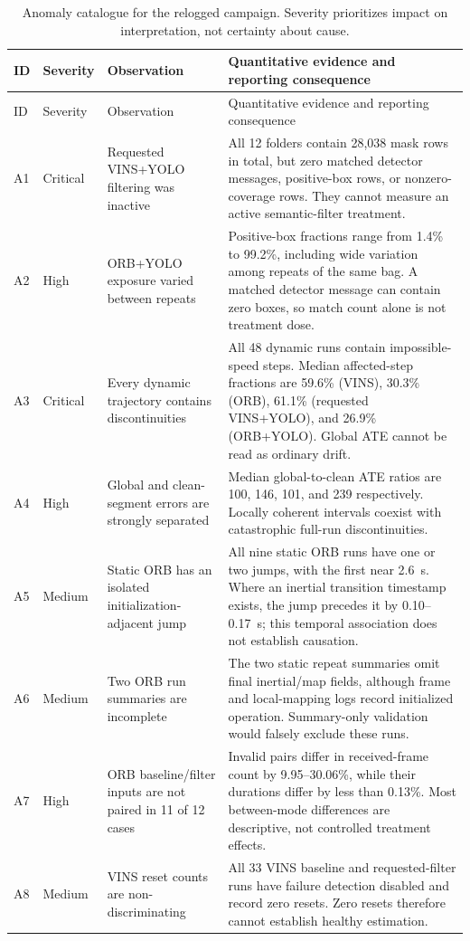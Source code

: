\begingroup
\small
\setlength{\tabcolsep}{4pt}
\setlength{\LTcapwidth}{\textwidth}
\begin{longtable}{p{}p{}p{}p{}}
\caption{Anomaly catalogue for the relogged campaign. Severity prioritizes
impact on interpretation, not certainty about cause.}
\label{tab:anomaly-catalogue}\\
\toprule
ID & Severity & Observation & Quantitative evidence and reporting consequence \\
\midrule
\endfirsthead
\toprule
ID & Severity & Observation & Quantitative evidence and reporting consequence \\
\midrule
\endhead
A1 & Critical & Requested VINS+YOLO filtering was inactive & All 12 folders contain
28,038 mask rows in total, but zero matched detector messages, positive-box
rows, or nonzero-coverage rows. They cannot measure an active semantic-filter
treatment. \\
A2 & High & ORB+YOLO exposure varied between repeats & Positive-box fractions
range from 1.4\% to 99.2\%, including wide variation among repeats of the same
bag. A matched detector message can contain zero boxes, so match count alone is
not treatment dose. \\
A3 & Critical & Every dynamic trajectory contains discontinuities & All 48
dynamic runs contain impossible-speed steps. Median affected-step fractions are
59.6\% (VINS), 30.3\% (ORB), 61.1\% (requested VINS+YOLO), and 26.9\%
(ORB+YOLO). Global ATE cannot be read as ordinary drift. \\
A4 & High & Global and clean-segment errors are strongly separated & Median
global-to-clean ATE ratios are 100, 146, 101, and 239 respectively. Locally
coherent intervals coexist with catastrophic full-run discontinuities. \\
A5 & Medium & Static ORB has an isolated initialization-adjacent jump & All nine
static ORB runs have one or two jumps, with the first near 2.6~s. Where an
inertial transition timestamp exists, the jump precedes it by 0.10--0.17~s;
this temporal association does not establish causation. \\
A6 & Medium & Two ORB run summaries are incomplete & The two static repeat
summaries omit final inertial/map fields, although frame and local-mapping logs
record initialized operation. Summary-only validation would falsely exclude
these runs. \\
A7 & High & ORB baseline/filter inputs are not paired in 11 of 12 cases & Invalid
pairs differ in received-frame count by 9.95--30.06\%, while their durations
differ by less than 0.13\%. Most between-mode differences are descriptive, not
controlled treatment effects. \\
A8 & Medium & VINS reset counts are non-discriminating & All 33 VINS baseline
and requested-filter runs have failure detection disabled and record zero
resets. Zero resets therefore cannot establish healthy estimation. \\
\bottomrule
\end{longtable}
